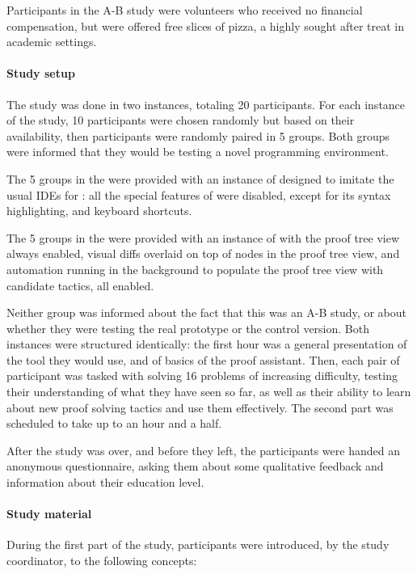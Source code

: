 Participants in the A-B study were volunteers who received no financial
compensation, but were offered free slices of pizza, a highly sought after treat
in academic settings.

\paragraph{Study setup}

The study was done in two instances, totaling 20 participants.  For each
instance of the study, 10 participants were chosen randomly but based on their
availability, then participants were randomly paired in 5 groups.  Both groups
were informed that they would be testing a novel programming environment.

The 5 groups in the  were provided with an instance of
\PeaCoq{} designed to imitate the usual IDEs for \Coq{}: all the special
features of \PeaCoq{} were disabled, except for its syntax highlighting, and
keyboard shortcuts.

The 5 groups in the  were provided with an instance of
\PeaCoq{} with the proof tree view always enabled, visual diffs overlaid on top
of nodes in the proof tree view, and automation running in the background to
populate the proof tree view with candidate tactics, all enabled.

Neither group was informed about the fact that this was an A-B study, or about
whether they were testing the real prototype or the control version.  Both
instances were structured identically: the first hour was a general presentation
of the tool they would use, and of basics of the \Coq{} proof assistant.  Then,
each pair of participant was tasked with solving 16 problems of increasing
difficulty, testing their understanding of what they have seen so far, as well
as their ability to learn about new proof solving tactics and use them
effectively.  The second part was scheduled to take up to an hour and a half.

After the study was over, and before they left, the participants were handed an
anonymous questionnaire, asking them about some qualitative feedback and
information about their education level.

\paragraph{Study material}

During the first part of the study, participants were introduced, by the study
coordinator, to the following concepts:

